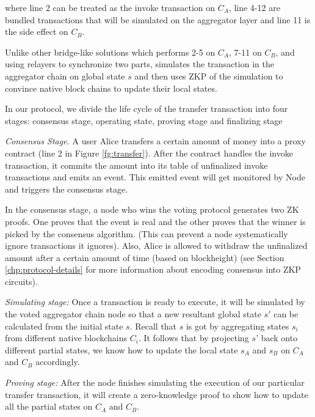 where line 2 can be treated as the invoke transaction on $C_A$, line 4-12 are bundled transactions that will be simulated on the aggregator layer and line 11 is the side effect on $C_B$.

Unlike other bridge-like solutions which performs 2-5 on $C_A$, 7-11 on $C_B$, and using relayers to synchronize two parts, \dprotocol simulates the transaction in the aggregator chain on global state $s$ and then uses ZKP of the simulation to convince native block chains to update their local states.

In our protocol, we divide the life cycle of the transfer transaction into four stages: consensus stage, operating state, proving stage and finalizing stage



\smallskip\noindent\emph{Consensus Stage.}
A user Alice transfers a certain amount of money into a proxy contract (line 2 in Figure \ref{fg:transfer}). After the contract handles the invoke transaction, it commits the amount into its table of unfinalized invoke transactions and emits an event. This emitted event will get monitored by \dprotocol Node and triggers the consensus stage.

In the consensus stage, a node who wins the voting protocol generates two ZK proofs. One proves that the event is real and the other proves that the winner is picked by the consensus algorithm. (This can prevent a node systematically ignore transactions it ignores). Also, Alice is allowed to withdraw the unfinalized amount after a certain amount of time (based on blockheight) (see Section \ref{chp:protocol-details} for more information about encoding consensus into ZKP circuits).

\smallskip\noindent\emph{Simulating stage:}
Once a transaction is ready to execute, it will be simulated by the voted aggregator chain node so that a new resultant global state $s'$ can be calculated from the initial state $s$. Recall that $s$ is got by aggregating states $s_i$ from different native blockchains $C_i$. It follows that by projecting $s’$ back onto different partial states, we know how to update the local state $s_A$ and $s_B$ on $C_A$ and $C_B$ accordingly.

\smallskip\noindent\emph{Proving stage:}
After the \dprotocol node finishes simulating the execution of our particular transfer transaction, it will create a zero-knowledge proof to show how to update all the partial states on $C_A$  and $C_B$.

